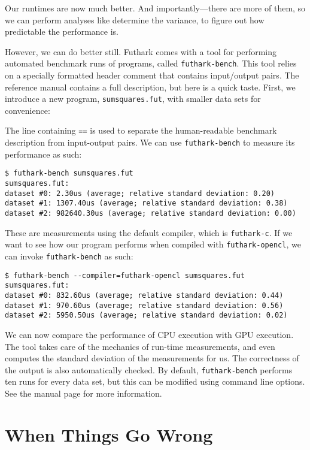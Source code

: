 \documentclass[oneside,11pt]{book}
\newenvironment{wrap}{\vspace{\topskip}\par\noindent\begin{minipage}{\linewidth}}{\end{minipage}\par}
\newcommand{\inplisting}[1]{\begin{wrap}\end{wrap}}
\begin{document}
Our runtimes are now much better.  And importantly---there are
more of them, so we can perform analyses like determine the variance,
to figure out how predictable the performance is.

However, we can do better still.  Futhark comes with a tool for
performing automated benchmark runs of programs, called
\texttt{futhark-bench}.  This tool relies on a specially formatted
header comment that contains input/output pairs.  The reference manual
contains a full description, but here is a quick taste.  First, we
introduce a new program, \texttt{sumsquares.fut}, with smaller data
sets for convenience:

\inplisting{src/sumsquares.fut}

The line containing \texttt{==} is used to separate the human-readable
benchmark description from input-output pairs.  We can use
\texttt{futhark-bench} to measure its performance as such:

\begin{verbatim}
$ futhark-bench sumsquares.fut
sumsquares.fut:
dataset #0: 2.30us (average; relative standard deviation: 0.20)
dataset #1: 1307.40us (average; relative standard deviation: 0.38)
dataset #2: 982640.30us (average; relative standard deviation: 0.00)
\end{verbatim}

These are measurements using the default compiler, which is
\texttt{futhark-c}.  If we want to see how our program performs when
compiled with \texttt{futhark-opencl}, we can invoke
\texttt{futhark-bench} as such:

\begin{verbatim}
$ futhark-bench --compiler=futhark-opencl sumsquares.fut
sumsquares.fut:
dataset #0: 832.60us (average; relative standard deviation: 0.44)
dataset #1: 970.60us (average; relative standard deviation: 0.56)
dataset #2: 5950.50us (average; relative standard deviation: 0.02)
\end{verbatim}

We can now compare the performance of CPU execution with GPU
execution.  The tool takes care of the mechanics of run-time
measurements, and even computes the standard deviation of the
measurements for us.  The correctness of the output is also
automatically checked.  By default, \texttt{futhark-bench} performs
ten runs for every data set, but this can be modified using command
line options.  See the manual page for more information.

\section{When Things Go Wrong}
\end{document}
